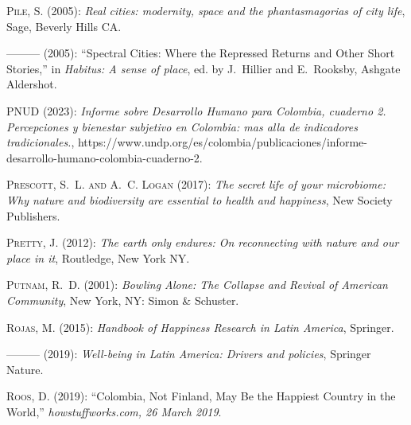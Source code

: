 \documentclass[10pt, letterpaper]{article}
\begin{document}
\begin{spacing}{2}
\begin{thebibliography}{120}
\textsc{Pile, S.} (2005{}): \emph{Real cities: modernity, space and
  the phantasmagorias of city life}, Sage, Beverly Hills CA.

---\hspace{-.1pt}---\hspace{-.1pt}--- (2005{}): \enquote{Spectral
  Cities: Where the Repressed Returns and Other Short Stories,} in
  \emph{Habitus: A sense of place}, ed. by J.~Hillier and E.~Rooksby, Ashgate
  Aldershot.

\textsc{PNUD} (2023): \emph{Informe sobre Desarrollo Humano para Colombia,
  cuaderno 2. Percepciones y bienestar subjetivo en Colombia: mas alla de
  indicadores tradicionales.},
  https://www.undp.org/es/colombia/publicaciones/informe-desarrollo-humano-colombia-cuaderno-2.

\textsc{Prescott, S.~L. and A.~C. Logan} (2017): \emph{The secret life of your
  microbiome: Why nature and biodiversity are essential to health and
  happiness}, New Society Publishers.

\textsc{Pretty, J.} (2012): \emph{The earth only endures: On reconnecting with
  nature and our place in it}, Routledge, New York NY.

\textsc{Putnam, R.~D.} (2001): \emph{Bowling Alone: The Collapse and Revival of
  American Community}, New York, NY: Simon \& Schuster.

\textsc{Rojas, M.} (2015): \emph{Handbook of Happiness Research in Latin
  America}, Springer.

---\hspace{-.1pt}---\hspace{-.1pt}--- (2019): \emph{Well-being in Latin
  America: Drivers and policies}, Springer Nature.

\textsc{Roos, D.} (2019): \enquote{Colombia, Not Finland, May Be the Happiest
  Country in the World,} \emph{howstuffworks.com, 26 March 2019}.


\end{thebibliography}
\end{spacing}
\end{document}
